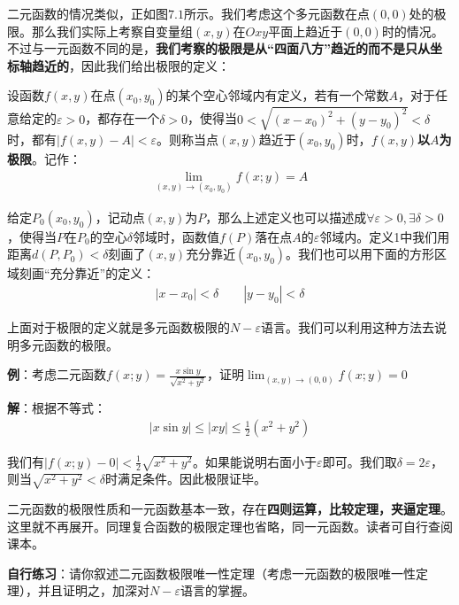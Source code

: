 \documentclass{ctexart}
\let\oldtextbf\textbf %
\renewcommand{\textbf}[1]{\textcolor{btex}{\oldtextbf{#1}}} %
\begin{document}
二元函数的情况类似，正如图$7.1$所示。我们考虑这个多元函数在点$(0,0)$处的极限。那么我们实际上考察自变量组$(x,y)$在$Oxy$平面上趋近于$(0,0)$时的情况。不过与一元函数不同的是，\textbf{我们考察的极限是从“四面八方”趋近的而不是只从坐标轴趋近的}，因此我们给出极限的定义：
\begin{tcolorbox}[
    colback=bac2,     %
    colframe=fra2,   %
    coltitle=white,             %
    coltext=tex2,
    title=二元函数的极限,
    fonttitle=\bfseries,        %
arc=3mm,                     %
breakable
]
设函数$f(x,y)$在点$(x_0,y_0)$的某个空心邻域内有定义，若有一个常数$A$，对于任意给定的$\varepsilon>0$，都存在一个$\delta>0$，使得当$0<\sqrt{(x-x_0)^2+(y-y_0)^2}<\delta$时，都有$|f(x,y)-A|<\varepsilon$。则称当点$(x,y)$趋近于$(x_0,y_0)$时，$f(x,y)$\textbf{以$A$为极限}。记作：
\begin{align*}
    \lim_{(x,y)\to(x_0,y_0)}f(x;y)=A\tag{7-2}
\end{align*}
\end{tcolorbox}

给定$P_0(x_0,y_0)$，记动点$(x,y)$为$P$，那么上述定义也可以描述成$\forall \varepsilon>0,\exists\delta>0$，使得当$P$在$P_0$的空心$\delta$邻域时，函数值$f(P)$落在点$A$的$\varepsilon$邻域内。定义1中我们用距离$d(P,P_0)<\delta$刻画了$(x,y)$充分靠近$(x_0,y_0)$。我们也可以用下面的方形区域刻画“充分靠近”的定义：
\begin{align*}
    |x-x_0|<\delta \qquad |y-y_0|<\delta 
\end{align*}

上面对于极限的定义就是多元函数极限的$N-\varepsilon$语言。我们可以利用这种方法去说明多元函数的极限。

\textbf{例}：考虑二元函数$f(x;y)=\frac{x\sin y}{\sqrt{x^2+y^2}}$，证明$\lim_{(x,y)\to(0,0)}f(x;y)=0$

\textbf{解}：根据不等式：
\begin{align*}
    |x\sin y|\leq|xy|\leq\frac{1}{2}(x^2+y^2)
\end{align*}

我们有$|f(x;y)-0|<\frac{1}{2}\sqrt{x^2+y^2}$。如果能说明右面小于$\varepsilon$即可。我们取$\delta=2\varepsilon$，则当$\sqrt{x^2+y^2}<\delta$时满足条件。因此极限证毕。

二元函数的极限性质和一元函数基本一致，存在\textbf{四则运算，比较定理，夹逼定理}。这里就不再展开。同理复合函数的极限定理也省略，同一元函数。读者可自行查阅课本。

\textbf{自行练习}：请你叙述二元函数极限唯一性定理（考虑一元函数的极限唯一性定理），并且证明之，加深对$N-\varepsilon$语言的掌握。
\end{document}
